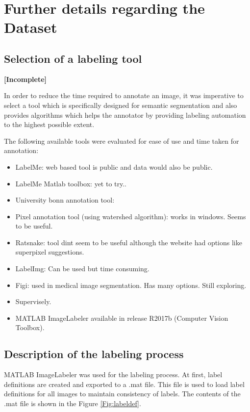 
\chapter{Further details regarding the Dataset}\label{appendix:dataset}

\section{Selection of a labeling tool}

\textbf{[Incomplete]}

In order to reduce the time required to annotate an image, it was imperative to select a tool which is specifically designed for semantic segmentation and also provides algorithms which helps the annotator by providing labeling automation to the highest possible extent.

The following available tools were evaluated for ease of use and time taken for annotation:
	\begin{itemize}
		\item LabelMe: web based tool is public and data would also be public.
		\item LabelMe Matlab toolbox: yet to try..
		\item University bonn annotation tool:
		\item Pixel annotation tool (using watershed algorithm): works in windows. Seems to be useful.
		\item Ratsnake: tool dint seem to be useful although the website had options like superpixel suggestions.
		\item LabelImg: Can be used but time consuming.
		\item Figi: used in medical image segmentation. Has many options. Still exploring.
		\item Supervisely.
		\item MATLAB ImageLabeler available in release R2017b (Computer Vision Toolbox).
	\end{itemize}

\section{Description of the labeling process}
\label{section:process}
MATLAB ImageLabeler was used for the labeling process. At first, label definitions are created and exported to a .mat file. This file is used to load label definitions for all images to maintain consistency of labels. The contents of the .mat file is shown in the Figure \ref{Fig:labeldef}.
	
